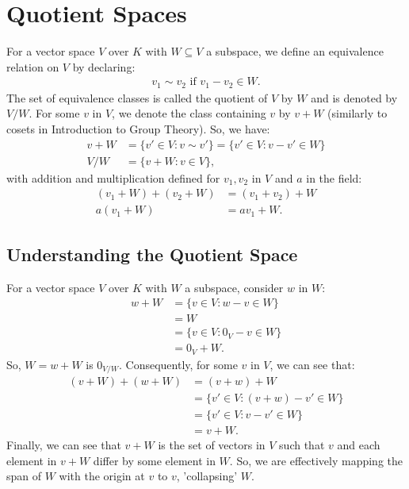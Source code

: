 \section{Quotient Spaces}

For a vector space $V$ over $K$ with $W \subseteq V$ a subspace,
we define an equivalence relation on $V$ by declaring: \begin{gather*}
  v_1 \sim v_2 \text{ if } v_1 - v_2 \in W.
\end{gather*} The set of equivalence classes is called the quotient of $V$
by $W$ and is denoted by $V/W$. For some $v$ in $V$, we denote the class containing
$v$ by $v + W$ (similarly to cosets in Introduction to Group Theory). So, we have:
\begin{align*}
  v + W &= \{v' \in V : v \sim v'\} = \{v' \in V : v - v' \in W\} \\
  V/W &= \{v + W : v \in V\},
\end{align*} with addition and multiplication defined for 
$v_1, v_2$ in $V$ and $a$ in the field: \begin{align*}
  (v_1 + W) + (v_2 + W) &= (v_1 + v_2) + W \\
  a(v_1 + W) &= av_1 + W.
\end{align*}

\subsection{Understanding the Quotient Space} \label{UnderstandingQuotients}

For a vector space $V$ over $K$ with $W$ a subspace,
consider $w$ in $W$: 
\begin{equation} \label{wplusWiszero}
  \begin{aligned}
    w + W &= \{v \in V : w - v \in W\} \\
    &= W \\
    &= \{v \in V : 0_V - v \in W\} \\
    &= 0_V + W.
  \end{aligned}
\end{equation} So, $W = w + W$ is $0_{V/W}$.
Consequently, for some $v$ in $V$, we can see that: \begin{align*}
  (v + W) + (w + W) &= (v + w) + W \\
  &= \{v' \in V : (v + w) - v' \in W\} \\
  &= \{v' \in V : v - v' \in W\} \\
  &= v + W.
\end{align*} Finally, we can see that
$v + W$ is the set of vectors in $V$ such that $v$ and each element
in $v + W$ differ by some element in $W$. So, we are effectively 
mapping the span of $W$ with the origin at $v$ to $v$, 'collapsing'
$W$.


